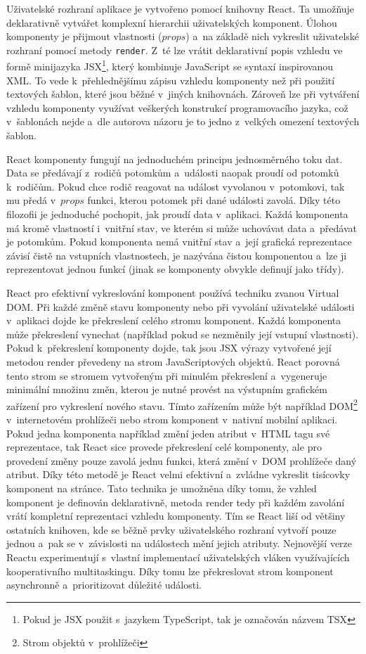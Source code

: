 Uživatelské rozhraní aplikace je vytvořeno pomocí knihovny React. Ta umožňuje deklarativně vytvářet komplexní hierarchii uživatelských komponent. Úlohou komponenty je přijmout vlastnosti ($props$) a~na základě nich vykreslit uživatelské rozhraní pomocí metody \texttt{render}. Z~té lze vrátit deklarativní popis vzhledu ve formě minijazyka JSX\footnote{Pokud je JSX použit s~jazykem TypeScript, tak je označován názvem TSX}, který kombinuje JavaScript se syntaxí inspirovanou XML. To vede k~přehlednějšímu zápisu vzhledu komponenty než při použití textových šablon, které jsou běžné v~jiných knihovnách. Zároveň lze při vytváření \mbox{vzhledu} komponenty využívat veškerých konstrukcí programovacího jazyka, což v~šablonách nejde a~dle autorova názoru je to jedno z~velkých omezení textových šablon.

React komponenty fungují na jednoduchém principu jednosměrného toku dat. Data se předávají z~rodičů potomkům a~události naopak proudí od potomků k~rodičům. Pokud chce rodič reagovat na událost vyvolanou v~potomkovi, tak mu předá v~$props$ funkci, kterou potomek při dané události zavolá. Díky této filozofii je jednoduché pochopit, jak proudí data v~aplikaci. Každá komponenta má kromě vlastností i~vnitřní stav, ve kterém si může uchovávat data a~předávat je potomkům. Pokud komponenta nemá vnitřní stav a~její grafická reprezentace závisí čistě na vstupních vlastnostech, je nazývána čistou komponentou a~lze ji reprezentovat jednou funkcí (jinak se komponenty obvykle definují jako třídy).

React pro efektivní vykreslování komponent používá techniku zvanou Virtual DOM. Při každé změně stavu komponenty nebo při vyvolání uživatelské události v~aplikaci dojde ke překreslení celého stromu komponent. Každá komponenta může překreslení vynechat (například pokud se nezměnily její vstupní vlastnosti). Pokud k~překreslení komponenty dojde, tak jsou JSX výrazy vytvořené její metodou render převedeny na strom JavaScriptových objektů. React porovná tento strom se stromem vytvořeným při minulém překreslení a~vygeneruje minimální množinu změn, kterou je nutné provést na výstupním grafickém zařízení pro vykreslení nového stavu. Tímto zařízením může být například DOM\footnote{Strom objektů v~prohlížeči} v~internetovém prohlížeči nebo strom komponent v~nativní mobilní aplikaci. Pokud jedna komponenta například změní jeden atribut v~HTML tagu své reprezentace, tak React sice provede překreslení celé komponenty, ale pro provedení změny pouze zavolá jednu funkci, která změní v~DOM prohlížeče daný atribut.  Díky této metodě je React velmi efektivní a~zvládne vykreslit tisícovky komponent na stránce. Tato technika je umožněna díky tomu, že vzhled komponent je definován deklarativně, metoda render tedy při každém zavolání vrátí kompletní reprezentaci vzhledu komponenty. Tím se React liší od většiny ostatních knihoven, kde se běžně prvky uživatelského rozhraní vytvoří pouze jednou a~pak se v~závislosti na událostech mění jejich atributy. Nejnovější verze Reactu experimentují s~vlastní implementací uživatelských vláken využívajících kooperativního multitaskingu. Díky tomu lze překreslovat strom komponent asynchronně a~prioritizovat důležité události.

